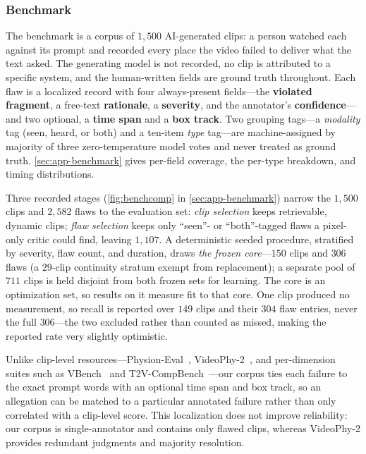 

\subsubsection{Benchmark}\label{sec:bench-spec}
The benchmark is a corpus of $1{,}500$ AI-generated clips: a person watched each against its prompt and recorded every place the video failed to deliver what the text asked. The generating model is not recorded, no clip is attributed to a specific system, and the human-written fields are ground truth throughout. Each flaw is a localized record with four always-present fields---the \textbf{violated fragment}, a free-text \textbf{rationale}, a \textbf{severity}, and the annotator's \textbf{confidence}---and two optional, a \textbf{time span} and a \textbf{box track}. Two grouping tags---a \emph{modality} tag (seen, heard, or both) and a ten-item \emph{type} tag---are machine-assigned by majority of three zero-temperature model votes and never treated as ground truth. \cref{sec:app-benchmark} gives per-field coverage, the per-type breakdown, and timing distributions.

Three recorded stages (\cref{fig:benchcomp} in \cref{sec:app-benchmark}) narrow the $1{,}500$ clips and $2{,}582$ flaws to the evaluation set: \emph{clip selection} keeps retrievable, dynamic clips; \emph{flaw selection} keeps only ``seen''- or ``both''-tagged flaws a pixel-only critic could find, leaving $1{,}107$. A deterministic seeded procedure, stratified by severity, flaw count, and duration, draws \emph{the frozen core}---$150$ clips and $306$ flaws (a $29$-clip continuity stratum exempt from replacement); a separate pool of $711$ clips is held disjoint from both frozen sets for learning. The core is an optimization set, so results on it measure fit to that core. One clip produced no measurement, so recall is reported over $149$ clips and their $304$ flaw entries, never the full $306$---the two excluded rather than counted as missed, making the reported rate very slightly optimistic.

Unlike clip-level resources\label{sec:bench-vs}---Physion-Eval~\cite{physioneval2026}, VideoPhy-2~\cite{videophy2_2025}, and per-dimension suites such as VBench~\cite{vbench2024} and T2V-CompBench~\cite{t2vcompbench2024}---our corpus ties each failure to the exact prompt words with an optional time span and box track, so an allegation can be matched to a particular annotated failure rather than only correlated with a clip-level score. This localization does not improve reliability: our corpus is single-annotator and contains only flawed clips, whereas VideoPhy-2 provides redundant judgments and majority resolution.
